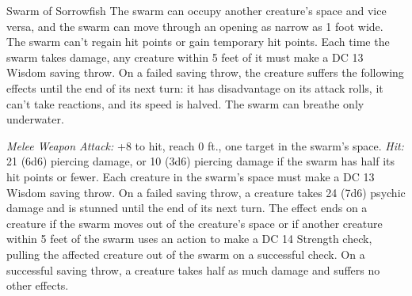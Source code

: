 \documentclass[10pt,a4paper,twoside,twocolumn,openany,bg=none,nodeprecatedcode]{dndbook}
\begin{document}
\begin{DndMonster}[float*=t]{Swarm of Sorrowfish}
\DndMonsterBasics[
armor-class = {14},
hit-points = {\DndDice{16d8 + 32}},
speed = {0 ft., 30 ft. (key)}
]
\DndMonsterAbilityScores[
 str = 16,
 dex = 19,
 con = 14,
 int = 1,
 wis = 11,
 cha = 3
]
\DndMonsterDetails[
damage-resistances = {bludgeoning, piercing, slashing},
damage-immunities = {psychic},
senses = {blindsight 60 ft. (blind beyond this radius), passive perception 10},
challenge = 6,
]
The swarm can occupy another creature's space and vice versa, and the swarm can move through an opening as narrow as 1 foot wide. The swarm can't regain hit points or gain temporary hit points.
Each time the swarm takes damage, any creature within 5 feet of it must make a DC 13 Wisdom saving throw. On a failed saving throw, the creature suffers the following effects until the end of its next turn: it has disadvantage on its attack rolls, it can't take reactions, and its speed is halved.
The swarm can breathe only underwater.
\par
{}
\textsl{Melee Weapon Attack:} +8 to hit, reach 0 ft., one target in the swarm's space. \textsl{Hit:} 21 (6d6) piercing damage, or 10 (3d6) piercing damage if the swarm has half its hit points or fewer.
Each creature in the swarm's space must make a DC 13 Wisdom saving throw. On a failed saving throw, a creature takes 24 (7d6) psychic damage and is stunned until the end of its next turn. The effect ends on a creature if the swarm moves out of the creature's space or if another creature within 5 feet of the swarm uses an action to make a DC 14 Strength check, pulling the affected creature out of the swarm on a successful check. On a successful saving throw, a creature takes half as much damage and suffers no other effects.
\end{DndMonster}
\end{document}
